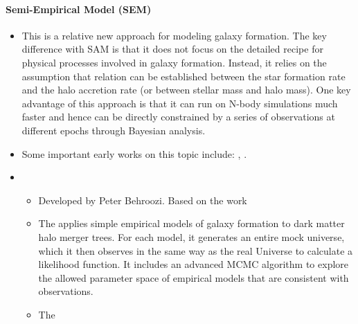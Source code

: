 \documentclass[letterpaper,10pt,english]{sphinxmanual}
\begin{document}
\paragraph{Semi-Empirical Model (SEM)}
\label{\detokenize{resource/astro/topics/galaxy_formation_model:semi-empirical-model-sem}}\begin{itemize}
\item {} 
This is a relative new approach for modeling galaxy formation. The
key difference with SAM is that it does not focus on the detailed
recipe for physical processes involved in galaxy formation. Instead,
it relies on the assumption that  relation can be
established between the star formation rate and the halo accretion
rate (or between stellar mass and halo mass). One key advantage of
this approach is that it can run on N-body simulations much faster
and hence can be directly constrained by a series of observations at
different epochs through Bayesian analysis.

\item {} 
Some important early works on this topic include: ,
.

\item {} 
\begin{itemize}
\item {} 
Developed by Peter Behroozi. Based on the work 

\item {} 
The  applies simple empirical models of galaxy
formation to dark matter halo merger trees. For each model, it
generates an entire mock universe, which it then observes in the
same way as the real Universe to calculate a likelihood function.
It includes an advanced MCMC algorithm to explore the allowed
parameter space of empirical models that are consistent with
observations.

\item {} 
The 


\end{itemize}
\end{itemize}
\end{document}
